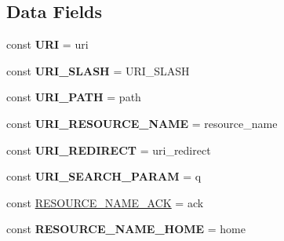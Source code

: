 \subsection*{Data Fields}
\begin{DoxyCompactItemize}
\item 
\hypertarget{interface_able_polecat___message___request_interface_ae8f2644cc12163a8b104c3ec6727ae3d}{}const {\bfseries U\+R\+I} = \textquotesingle{}uri\textquotesingle{}\label{interface_able_polecat___message___request_interface_ae8f2644cc12163a8b104c3ec6727ae3d}

\item 
\hypertarget{interface_able_polecat___message___request_interface_a0ac31bc8411631c18da6cd1b189125d9}{}const {\bfseries U\+R\+I\+\_\+\+S\+L\+A\+S\+H} = U\+R\+I\+\_\+\+S\+L\+A\+S\+H\label{interface_able_polecat___message___request_interface_a0ac31bc8411631c18da6cd1b189125d9}

\item 
\hypertarget{interface_able_polecat___message___request_interface_af0e8f16a6215d6c08bacc2ab85269be6}{}const {\bfseries U\+R\+I\+\_\+\+P\+A\+T\+H} = \textquotesingle{}path\textquotesingle{}\label{interface_able_polecat___message___request_interface_af0e8f16a6215d6c08bacc2ab85269be6}

\item 
\hypertarget{interface_able_polecat___message___request_interface_a338a1b904d68254dc1d5ca30a68c7a2f}{}const {\bfseries U\+R\+I\+\_\+\+R\+E\+S\+O\+U\+R\+C\+E\+\_\+\+N\+A\+M\+E} = \textquotesingle{}resource\+\_\+name\textquotesingle{}\label{interface_able_polecat___message___request_interface_a338a1b904d68254dc1d5ca30a68c7a2f}

\item 
\hypertarget{interface_able_polecat___message___request_interface_ac3264037680f6777d0b1f1f41c10e612}{}const {\bfseries U\+R\+I\+\_\+\+R\+E\+D\+I\+R\+E\+C\+T} = \textquotesingle{}uri\+\_\+redirect\textquotesingle{}\label{interface_able_polecat___message___request_interface_ac3264037680f6777d0b1f1f41c10e612}

\item 
\hypertarget{interface_able_polecat___message___request_interface_aabac9c0415cb1fc8114f38584031d039}{}const {\bfseries U\+R\+I\+\_\+\+S\+E\+A\+R\+C\+H\+\_\+\+P\+A\+R\+A\+M} = \textquotesingle{}q\textquotesingle{}\label{interface_able_polecat___message___request_interface_aabac9c0415cb1fc8114f38584031d039}

\item 
const \hyperlink{interface_able_polecat___message___request_interface_aa207fcff72e63e4066e944379ff91baf}{R\+E\+S\+O\+U\+R\+C\+E\+\_\+\+N\+A\+M\+E\+\_\+\+A\+C\+K} = \textquotesingle{}ack\textquotesingle{}
\item 
\hypertarget{interface_able_polecat___message___request_interface_ab26b44d36673bcdffd6d95d1322eceb0}{}const {\bfseries R\+E\+S\+O\+U\+R\+C\+E\+\_\+\+N\+A\+M\+E\+\_\+\+H\+O\+M\+E} = \textquotesingle{}home\textquotesingle{}\label{interface_able_polecat___message___request_interface_ab26b44d36673bcdffd6d95d1322eceb0}


\end{DoxyCompactItemize}
